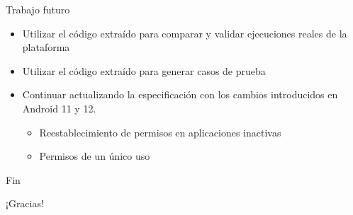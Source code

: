 \documentclass[pdf, handout]{beamer} %
\begin{document}
\begin{frame}{Trabajo futuro}
    \begin{itemize}[<+->]
        \item Utilizar el código extraído para comparar y validar ejecuciones reales de la
              plataforma
        \item Utilizar el código extraído para generar casos de prueba
        \item Continuar actualizando la especificación con los cambios introducidos en Android 11 y
              12.
              \begin{itemize}
                  \item Reestablecimiento de permisos en aplicaciones inactivas
                  \item Permisos de un único uso
              \end{itemize}
    \end{itemize}
\end{frame}

\begin{frame}{Fin}
    \begin{center}
        \huge¡Gracias!
    \end{center}
\end{frame}

\end{document}
